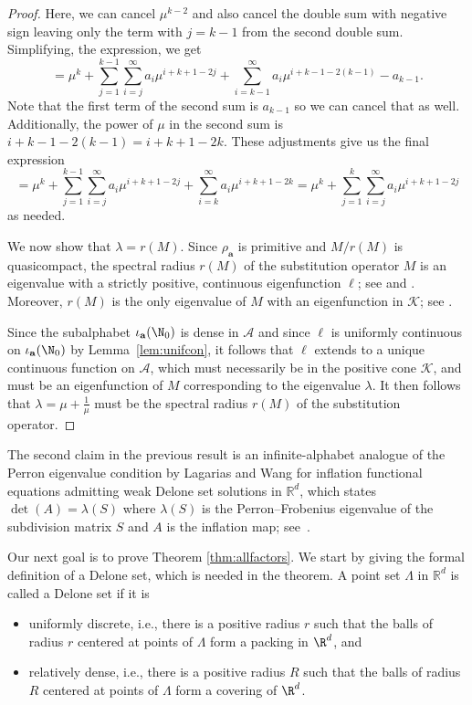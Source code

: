 \begin{proof}
Here, we can cancel $\mu^{k-2}$ and also cancel the double sum with negative sign leaving only the term with $j=k-1$ from the second double sum. Simplifying, the expression, we get
$$=
\mu^k+\sum_{j=1}^{k-1}\sum_{i=j}^\infty a_i\mu^{i+k+1-2j}+\sum_{i=k-1}^\infty a_i\mu^{i+k-1-2(k-1)}-a_{k-1}.$$
Note that the first term of the second sum is $a_{k-1}$ so we can cancel that as well. Additionally, the power of $\mu$ in the second sum is $i+k-1-2(k-1)=i+k+1-2k$. These adjustments give us the final expression
$$=\mu^k+\sum_{j=1}^{k-1}\sum_{i=j}^\infty a_i\mu^{i+k+1-2j}+\sum_{i=k}^\infty a_i\mu^{i+k+1-2k}=\mu^k+\sum_{j=1}^k\sum_{i=j}^\infty a_i\mu^{i+k+1-2j}$$
as needed.

We now show that $\lambda=r(M)$. Since $\rho^{ }_{\mathbf a}$ is primitive and
$M/r(M)$ is quasicompact, the spectral radius $r(M)$ of the substitution operator $M$ is an eigenvalue with a strictly positive, continuous eigenfunction $\ell$;  see \cite[Thm. 5.4(B)]{MRW2} and  \cite[Thm.~V.5.2 and Prop.~V.5.6]{Sch}. Moreover, $r(M)$ is the only eigenvalue of $M$ with an eigenfunction in $\mathcal{K}$; see \cite[Thm.~V.5.2(iv)]{Sch}.  

Since the subalphabet $\iota_{\mathbf{a}}(\N_0)$ is dense in $\mathcal{A}$ and since $\ell$ is uniformly continuous  on $\iota_{\mathbf{a}}(\N_0)$ by Lemma~\ref{lem:unifcon}, it follows that $\ell$ extends to a unique continuous function on $\mathcal{A}$, which must necessarily be in the positive cone $\mathcal{K}$, and must be an eigenfunction of $M$ corresponding to the eigenvalue $\lambda$. It then follows that $\lambda=\mu+\frac{1}{\mu}$ must be the spectral radius $r(M)$ of the substitution operator. 
\end{proof}


\begin{rem}
The second claim in the previous result is an infinite-alphabet analogue of the Perron eigenvalue condition by Lagarias and Wang for inflation functional equations admitting weak Delone set solutions in $\mathbb{R}^{d}$, which states $\det(A)=\lambda(S)$ where $\lambda(S)$ is the Perron--Frobenius eigenvalue of the subdivision matrix $S$ and $A$ is the inflation map; see~\cite{LW}. 
\end{rem}


Our next goal is to prove Theorem \ref{thm:allfactors}. We start by giving the formal definition of a Delone set, which is needed in the theorem. A point set $\varLambda$ in $\mathbb{R}^d$ is called a Delone set if it is \begin{itemize}
\item uniformly discrete, i.e., there is a positive radius $r$ such that the balls of radius $r$ centered at points of $\varLambda$ form a packing in $\R^d$, and  
\item relatively dense, i.e., there is a positive radius $R$ such that the balls of radius $R$ centered at points of $\varLambda$ form a covering of $\R^d$.
\end{itemize}



